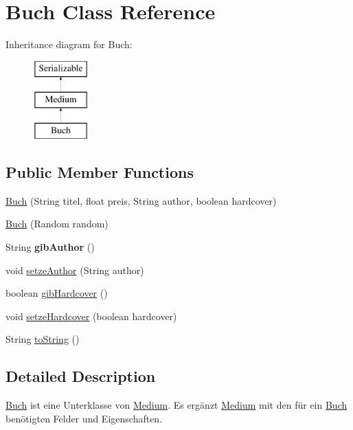 \hypertarget{classBuch}{\section{Buch Class Reference}
\label{classBuch}
}
Inheritance diagram for Buch\-:\begin{figure}[H]
\begin{center}
\leavevmode
\includegraphics[height=3.000000cm]{classBuch}
\end{center}
\end{figure}
\subsection*{Public Member Functions}
\begin{DoxyCompactItemize}
\item 
\hyperlink{classBuch_ad7e7857afc44de2527a626f700d9ec48}{Buch} (String titel, float preis, String author, boolean hardcover)
\item 
\hyperlink{classBuch_ad45d958a80f07ea2cb5cb564b5fd2254}{Buch} (Random random)
\item 
\hypertarget{classBuch_a4c8bf45949dcf36734951c7aeee4868b}{String {\bfseries gib\-Author} ()}\label{classBuch_a4c8bf45949dcf36734951c7aeee4868b}

\item 
void \hyperlink{classBuch_a92311208a213dfb8b8feea909269ee98}{setze\-Author} (String author)
\item 
boolean \hyperlink{classBuch_a8707574befbe4b23f44ee1ca52b90d59}{gib\-Hardcover} ()
\item 
void \hyperlink{classBuch_a364e47149d84b52313f6222de0d1eb1e}{setze\-Hardcover} (boolean hardcover)
\item 
String \hyperlink{classBuch_ac0d79c56b86295a71110e0437d4d0bfc}{to\-String} ()
\end{DoxyCompactItemize}


\subsection{Detailed Description}
\hyperlink{classBuch}{Buch} ist eine Unterklasse von \hyperlink{classMedium}{Medium}. Es ergänzt \hyperlink{classMedium}{Medium} mit den für ein \hyperlink{classBuch}{Buch} benötigten Felder und Eigenschaften.

